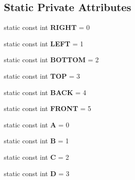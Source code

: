 \subsection*{Static Private Attributes}
\begin{DoxyCompactItemize}
\item 
\mbox{\label{classflounder_1_1frustum_a6e47f999e23af7a41b7394b241c2516b}} 
static const int {\bfseries R\+I\+G\+HT} = 0
\item 
\mbox{\label{classflounder_1_1frustum_ab551050e95f30eb4aa7c6504d1061375}} 
static const int {\bfseries L\+E\+FT} = 1
\item 
\mbox{\label{classflounder_1_1frustum_aa82e219eea8b901057a59e1cf82132e5}} 
static const int {\bfseries B\+O\+T\+T\+OM} = 2
\item 
\mbox{\label{classflounder_1_1frustum_a4e6162231d0dd96e8b6be08ed2d8d59a}} 
static const int {\bfseries T\+OP} = 3
\item 
\mbox{\label{classflounder_1_1frustum_a3e3bd06bc713d916a8271f833aec841c}} 
static const int {\bfseries B\+A\+CK} = 4
\item 
\mbox{\label{classflounder_1_1frustum_a4b7addc0fa50f02a1c1241478afe3935}} 
static const int {\bfseries F\+R\+O\+NT} = 5
\item 
\mbox{\label{classflounder_1_1frustum_a721bf6ef915d6c31b0ae4f26ec585a6a}} 
static const int {\bfseries A} = 0
\item 
\mbox{\label{classflounder_1_1frustum_a7d42992d7ddf3cbb02c9d3475ca2653f}} 
static const int {\bfseries B} = 1
\item 
\mbox{\label{classflounder_1_1frustum_af0733695cb19e762e3d7c53753a4428c}} 
static const int {\bfseries C} = 2
\item 
\mbox{\label{classflounder_1_1frustum_af7145693c8c6d85c1d6868f5b3799012}} 
static const int {\bfseries D} = 3
\end{DoxyCompactItemize}


